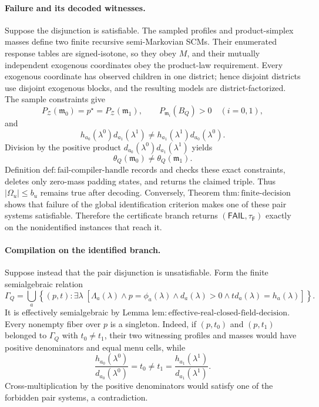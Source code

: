 \paragraph{Failure and its decoded witnesses.}
Suppose the disjunction is satisfiable.  The sampled profiles and product-simplex masses define two finite recursive semi-Markovian SCMs.  Their enumerated response tables are signed-isotone, so they obey \(M\), and their mutually independent exogenous coordinates obey the product-law requirement.  Every exogenous coordinate has observed children in one district; hence disjoint districts use disjoint exogenous blocks, and the resulting models are district-factorized.  The sample constraints give
\[
 P_{\mathcal Z}(\mathfrak m_0)
 =p^{\star}
 =P_{\mathcal Z}(\mathfrak m_1),
 \qquad
 P_{\mathfrak m_i}(B_Q)>0\quad(i=0,1),
\]
and
\[
 h_{a_0}(\lambda^0)d_{a_1}(\lambda^1)
 \ne h_{a_1}(\lambda^1)d_{a_0}(\lambda^0).
\]
Division by the positive product \(d_{a_0}(\lambda^0)d_{a_1}(\lambda^1)\) yields
\[
 \theta_Q(\mathfrak m_0)\ne\theta_Q(\mathfrak m_1).
\]
Definition \(\mathrm{def:fail\text{-}compiler\text{-}handle}\) records and checks these exact constraints, deletes only zero-mass padding states, and returns the claimed triple.  Thus \(|\Omega_u|\le b_u\) remains true after decoding.  Conversely, Theorem \(\mathrm{thm:finite\text{-}decision}\) shows that failure of the global identification criterion makes one of these pair systems satisfiable.  Therefore the certificate branch returns \((\mathsf{FAIL},\tau_{\mathsf F})\) exactly on the nonidentified instances that reach it.

\paragraph{Compilation on the identified branch.}
Suppose instead that the pair disjunction is unsatisfiable.  Form the finite semialgebraic relation
\[
 \Gamma_Q
 =\bigcup_a\left\{(p,t):
 \exists\lambda\;\left[
 \Lambda_a(\lambda)
 \wedge p=\phi_a(\lambda)
 \wedge d_a(\lambda)>0
 \wedge t d_a(\lambda)=h_a(\lambda)
 \right]\right\}.
\]
It is effectively semialgebraic by Lemma \(\mathrm{lem:effective\text{-}real\text{-}closed\text{-}field\text{-}decision}\).  Every nonempty fiber over \(p\) is a singleton.  Indeed, if \((p,t_0)\) and \((p,t_1)\) belonged to \(\Gamma_Q\) with \(t_0\ne t_1\), their two witnessing profiles and masses would have positive denominators and equal menu cells, while
\[
 \frac{h_{a_0}(\lambda^0)}{d_{a_0}(\lambda^0)}=t_0
 \ne t_1=
 \frac{h_{a_1}(\lambda^1)}{d_{a_1}(\lambda^1)}.
\]
Cross-multiplication by the positive denominators would satisfy one of the forbidden pair systems, a contradiction.

